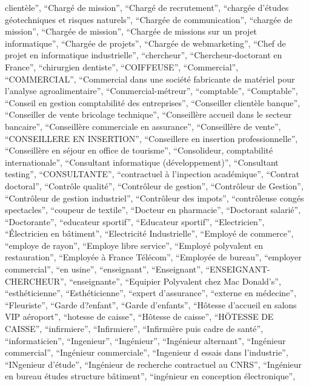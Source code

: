 \documentclass[
  letterpaper,
  DIV=11,
  numbers=noendperiod]{scrartcl}
\begin{document}
\begin{itemize}
  clientèle'', ``Chargé de mission'', ``Chargé de recrutement'',
  ``chargée d'études géotechniques et risques naturels'', ``Chargée de
  communication'', ``chargée de mission'', ``Chargée de mission'',
  ``Chargée de missions sur un projet informatique'', ``Chargée de
  projets'', ``Chargée de webmarketing'', ``Chef de projet en
  informatique industrielle'', ``chercheur'', ``Chercheur-doctorant en
  France'', ``chirurgien dentiste'', ``COIFFEUSE'', ``Commercial'',
  ``COMMERCIAL'', ``Commercial dans une société fabricante de matériel
  pour l'analyse agroalimentaire'', ``Commercial-métreur'',
  ``comptable'', ``Comptable'', ``Conseil en gestion comptabilité des
  entreprises'', ``Conseiller clientèle banque'', ``Conseiller de vente
  bricolage technique'', ``Conseillère accueil dans le secteur
  bancaire'', ``Conseillère commerciale en assurance'', ``Conseillère de
  vente'', ``CONSEILLERE EN INSERTION'', ``Conseillere en insertion
  professionnelle'', ``Conseillère en séjour en office de tourisme'',
  ``Consolideur, comptabilité internationale'', ``Consultant
  informatique (développement)'', ``Consultant testing'',
  ``CONSULTANTE'', ``contractuel à l'inpection académique'', ``Contrat
  doctoral'', ``Contrôle qualité'', ``Contrôleur de gestion'',
  ``Contrôleur de Gestion'', ``Contrôleur de gestion industriel'',
  ``Contrôleur des impots'', ``contrôleuse congés spectacles'',
  ``coupeur de textile'', ``Docteur en pharmacie'', ``Doctorant
  salarié'', ``Doctorante'', ``educateur sportif'', ``Educateur
  sportif'', ``Electricien'', ``Électricien en bâtiment'', ``Electricité
  Industrielle'', ``Employé de commerce'', ``employe de rayon'',
  ``Employe libre service'', ``Employé polyvalent en restauration'',
  ``Employée à France Télécom'', ``Employée de bureau'', ``employer
  commercial'', ``en usine'', ``enseignant'', ``Enseignant'',
  ``ENSEIGNANT-CHERCHEUR'', ``enseignante'', ``Equipier Polyvalent chez
  Mac Donald's'', ``esthéticienne'', ``Esthéticienne'', ``expert
  d'assurance'', ``externe en médecine'', ``Fleuriste'', ``Garde
  d?enfant'', ``Garde d'enfants'', ``Hôtesse d'accueil en salons VIP
  aéroport'', ``hotesse de caisse'', ``Hôtesse de caisse'', ``HÖTESSE DE
  CAISSE'', ``infirmiere'', ``Infirmiere'', ``Infirmière puis cadre de
  santé'', ``informaticien'', ``Ingenieur'', ``Ingénieur'', ``Ingénieur
  alternant'', ``Ingénieur commercial'', ``Ingénieur commerciale'',
  ``Ingenieur d essais dans l'industrie'', ``INgenieur d'étude'',
  ``Ingénieur de recherche contractuel au CNRS'', ``Ingénieur en bureau
  études structure bâtiment'', ``ingénieur en conception électronique'',

\end{itemize}
\end{document}
